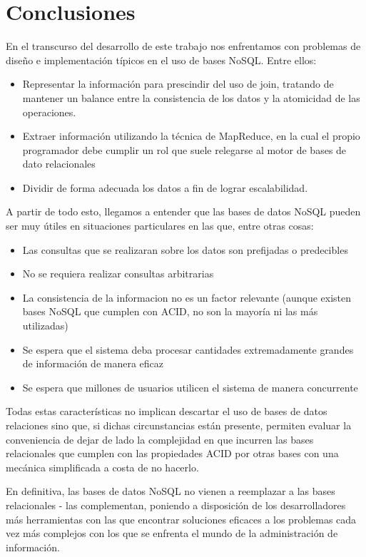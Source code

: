 \section{Conclusiones}

En el transcurso del desarrollo de este trabajo nos enfrentamos con problemas de diseño e implementación
típicos en el uso de bases NoSQL. Entre ellos:

\begin{itemize}
  \item Representar la información para prescindir del uso de join, tratando de mantener un balance entre
la consistencia de los datos y la atomicidad de las operaciones.
  \item  Extraer información
utilizando la técnica de MapReduce, en la cual el propio programador debe cumplir un rol que suele relegarse al motor de bases de dato relacionales
  \item Dividir de forma adecuada los datos a fin de lograr escalabilidad.
\end{itemize}

A partir de todo esto, llegamos a entender que las bases de datos NoSQL pueden ser muy útiles en situaciones particulares en las que, entre otras cosas:
\begin{itemize}
  \item Las consultas que se realizaran sobre los datos son prefijadas o predecibles
  \item No se requiera realizar consultas arbitrarias
  \item La consistencia de la informacion no es un factor relevante (aunque existen bases NoSQL que cumplen con ACID, no son la mayoría ni las más utilizadas)
  \item Se espera que el sistema deba procesar cantidades extremadamente grandes de información de manera eficaz
  \item Se espera que millones de usuarios utilicen el sistema de manera concurrente
\end{itemize}

Todas estas características no implican descartar el uso de bases de datos relaciones sino que, si dichas circunstancias están presente, permiten evaluar
la conveniencia de dejar de lado la complejidad en que incurren las bases relacionales que cumplen con las propiedades ACID por otras bases con una mecánica simplificada a costa de
no hacerlo.

En definitiva, las bases de datos NoSQL no vienen a reemplazar a las bases relacionales - las complementan, poniendo a disposición de los desarrolladores
más herramientas con las que encontrar soluciones eficaces a los problemas cada
vez más complejos con los que se enfrenta el mundo de la administración de información.
